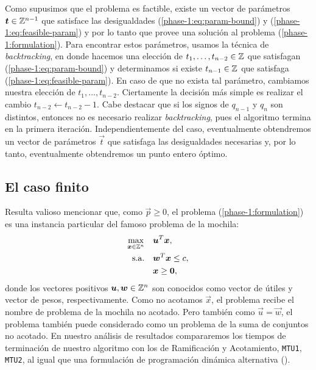 Como supusimos que el problema es factible, existe un vector de parámetros $\boldsymbol{t} \in \mathbb{Z}^{n-1}$
que satisface las desigualdades (\ref{phase-1:eq:param-bound}) y (\ref{phase-1:eq:feasible-param}) y
por lo tanto que provee una solución al problema (\ref{phase-1:formulation}). Para encontrar estos
parámetros, usamos la técnica de \textit{backtracking}, en donde hacemos una elección de $t_1,
\ldots, t_{n-2} \in \mathbb{Z}$ que satisfagan (\ref{phase-1:eq:param-bound}) y determinamos si existe
$t_{n-1} \in \mathbb{Z}$ que satisfaga (\ref{phase-1:eq:feasible-param}). En caso de que no exista tal
parámetro, cambiamos nuestra elección de $t_1, \ldots, t_{n-2}$. Ciertamente la decisión más simple
es realizar el cambio $t_{n-2} \leftarrow t_{n-2} - 1$. Cabe destacar que si los signos de $q_{n-1}$
y $q_n$ son distintos, entonces no es necesario realizar \textit{backtracking}, pues el algoritmo
termina en la primera iteración. Independientemente del caso, eventualmente obtendremos un vector de
parámetros $\vec{t}$ que satisfaga las desigualdades necesarias y, por lo tanto, eventualmente
obtendremos un punto entero óptimo.

\subsection{El caso finito}
\noindent
Resulta valioso mencionar que, como $\vec{p} \geq 0$, el problema (\ref{phase-1:formulation}) es una
instancia particular del famoso problema de la mochila:
\begin{subequations}
	\label{knapsack-formulation}
	\begin{align}
		\max_{\boldsymbol{x} \in \mathbb{Z}^n} \quad
			& \boldsymbol{u}^T\boldsymbol{x}, \\
		\text{s.a.} \quad
			& \boldsymbol{w}^T\boldsymbol{x} \leq c, \\
			& \boldsymbol{x} \geq \boldsymbol{0},
	\end{align}
\end{subequations}
donde los vectores positivos $\boldsymbol{u}, \boldsymbol{w} \in \mathbb{Z}^n$ son conocidos como vector de útiles y
vector de pesos, respectivamente. Como no acotamos $\vec{x}$, el problema recibe el nombre de
problema de la mochila no acotado. Pero también como $\vec{u} = \vec{w}$, el problema
también puede considerado como un problema de la suma de conjuntos no acotado. En
nuestro análisis de resultados compararemos los tiempos de terminación de nuestro algoritmo con
los de Ramificación y Acotamiento, \texttt{MTU1}, \texttt{MTU2}, al igual que una formulación de
programación dinámica alternativa (\cite{martello}).

